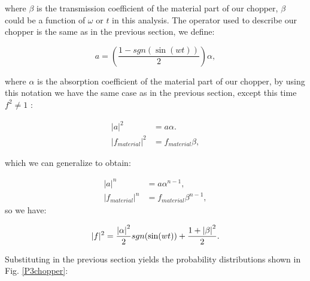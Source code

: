 \documentclass{book}
\begin{document}
where $\beta$ is the transmission coefficient of the material part of our chopper, $\beta$ could be a function of  $\omega$ or $t$ in this analysis. The operator used to describe our chopper is the same as in the previous section, we define:

\vspace{0.5cm}
\begin{equation}
a=\left(\frac{1-sgn(\sin(wt))}{2}\right) \alpha,
\end{equation}
\vspace{0.5cm}

where $\alpha$ is the absorption coefficient of the material part of our chopper, by using this notation we have the same case as in the previous section, except this time $f^2 \neq 1$ :

\begin{align}
|a|^2&=a \alpha.\\
|f_{material}|^2&=f_{material} \beta,
\end{align}

which we can generalize to obtain:

\begin{align}
|a|^n&=a\alpha^{n-1},\\
|f_{material}|^n&=f_{material} \beta^{n-1},
\end{align}
so we have:

\begin{equation}
|f|^2=  \frac{\abs{\alpha}^2}{2} sgn(\sin(wt)) +\frac{1+\abs{\beta}^2}{2}.
\end{equation}



Substituting in the previous section yields the probability distributions shown in Fig. \ref{P3chopper}:
\end{document}

